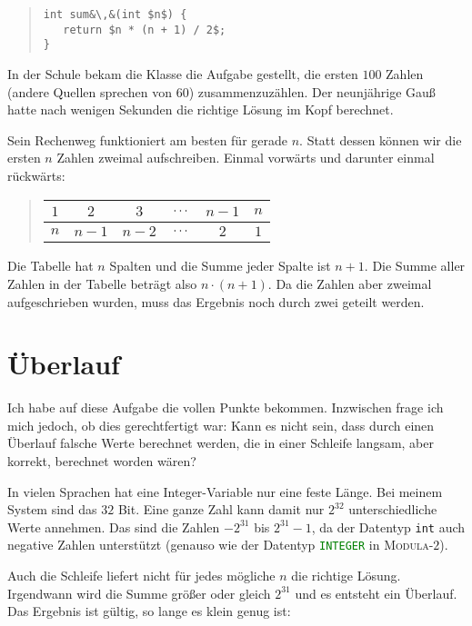 \documentclass[a5paper,landscape,ngerman,10pt]{article}
\begin{document}
\begin{quotation}
\begin{lstlisting}
int sum&\,&(int $n$) {
   return $n * (n + 1) / 2$;
}
\end{lstlisting}
\end{quotation}

In der Schule bekam die Klasse die Aufgabe gestellt, die ersten $100$ Zahlen
(andere Quellen sprechen von $60$) zusammenzuzählen.
Der neunjährige Gauß hatte nach wenigen Sekunden die richtige Lösung im Kopf
berechnet.

Sein Rechenweg funktioniert am besten für gerade $n$.
Statt dessen können wir die ersten $n$ Zahlen zweimal aufschreiben.
Einmal vorwärts und darunter einmal rückwärts:

\begin{quotation}
\begin{tabular}{cccccc}
\toprule
$1$&$2$&$3$&$\mathstrut\cdots$&$n-1$&$n$\\
\midrule
$n$&$n-1$&$n-2$&$\mathstrut\cdots$&$2$&$1$\\
\bottomrule
\end{tabular}
\end{quotation}

Die Tabelle hat $n$ Spalten und die Summe jeder Spalte ist $n+1$.
Die Summe aller Zahlen in der Tabelle beträgt also $n\cdot(n+1)$.
Da die Zahlen aber zweimal aufgeschrieben wurden, muss das
Ergebnis noch durch zwei geteilt werden.

\section{Überlauf}

Ich habe auf diese Aufgabe die vollen Punkte bekommen.
Inzwischen frage ich mich jedoch, ob dies gerechtfertigt war:
Kann es nicht sein, dass durch einen Überlauf falsche Werte
berechnet werden, die in einer Schleife langsam, aber korrekt,
berechnet worden wären?

In vielen Sprachen hat eine Integer-Variable nur eine feste Länge.
Bei meinem System sind das $32$ Bit.
Eine ganze Zahl kann damit nur $2^{32}$ unterschiedliche Werte annehmen.
Das sind die Zahlen $-2^{31}$ bis $2^{31}-1$, da der Datentyp \lstinline|int|
auch negative Zahlen unterstützt
(genauso wie der Datentyp \lstinline[language=Modula-2]|INTEGER|
in \textsc{Modula-$2$}).

Auch die Schleife liefert nicht für jedes mögliche $n$ die richtige Lösung.
Irgendwann wird die Summe größer oder gleich $2^{31}$ und es entsteht ein
Überlauf.
Das Ergebnis ist gültig, so lange es klein genug ist:
\end{document}
